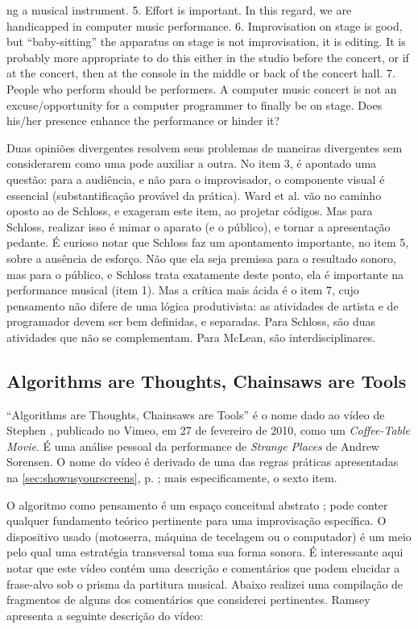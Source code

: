 \begin{citacao}
{ng a musical instrument. 5. Effort is important. In this regard, we are handicapped in computer music performance. 6. Improvisation on stage is good, but “baby-sitting” the apparatus on stage is not improvisation, it is editing. It is probably more appropriate to do this either in the studio before the concert, or if at the concert, then at the console in the middle or back of the concert hall. 7. People who perform should be performers. A computer music concert is not an excuse/opportunity for a computer programmer to finally be on stage. Does his/her presence enhance the performance or hinder it?} 
\end{citacao}

Duas opiniões divergentes resolvem seus problemas de maneiras divergentes sem considerarem como uma pode auxiliar a outra. No item 3, é apontado uma questão: para a audiência, e não para o improvisador, o componente visual é essencial (substantificação provável da prática). Ward et al. vão no caminho oposto ao de Schloss, e exageram este item, ao projetar códigos. Mas para Schloss, realizar isso é mimar o aparato (e o público), e tornar a apresentação pedante. É curioso notar que Schloss faz um apontamento importante, no item 5, sobre a ausência de esforço. Não que ela seja premissa para o resultado sonoro,  mas para o público, e Schloss trata exatamente deste ponto, ela é importante na performance musical (item 1). Mas a crítica mais ácida é o item 7, cujo pensamento não difere de uma lógica produtivista: as atividades de artista e de programador devem ser bem definidas, e separadas. Para Schloss, são duas atividades que não se complementam. Para McLean, são interdisciplinares.


\subsection{Algorithms are Thoughts, Chainsaws are Tools}

``Algorithms are Thoughts, Chainsaws are Tools'' é o nome dado ao vídeo de Stephen , publicado no Vimeo, em  27 de fevereiro de 2010, como um \emph{Coffee-Table Movie}. É uma análise pessoal da performance de \emph{Strange Places} de Andrew Sorensen. O nome do vídeo é derivado de uma das regras práticas apresentadas na \autoref{sec:showusyourscreens}, p. \pageref{sec:showusyourscreens}; mais especificamente, o sexto item.

O algoritmo como pensamento é um espaço conceitual abstrato ; pode conter qualquer fundamento teórico pertinente para uma improvisação específica. O dispositivo usado (motoserra, máquina de tecelagem ou o computador) é um meio pelo qual uma estratégia transversal  toma sua forma sonora. É interessante aqui notar que este vídeo contém uma descrição e comentários que podem elucidar a frase-alvo sob o prisma da partitura musical. Abaixo realizei uma compilação de fragmentos de alguns dos comentários que considerei pertinentes. Ramsey apresenta a seguinte descrição do vídeo:

